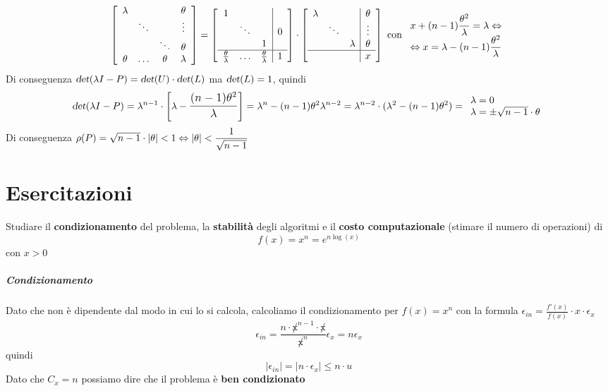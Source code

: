 \documentclass[10pt]{book}
\begin{document}
$$\left[ \begin{array}{c c c c}
\lambda & & & \theta\\
& \ddots & & \vdots\\
& & \ddots & \theta\\
\theta & \ldots & \theta & \lambda
\end{array}\right] = \left[ \begin{array}{c c c | c}
1 & & & \\
& \ddots & & 0\\
& & 1 & \\
\hline
\frac{\theta}{\lambda} & \ldots & \frac{\theta}{\lambda} & 1
\end{array}\right]\cdot \left[ \begin{array}{c c c | c}
\lambda & & & \theta \\
& \ddots & & \vdots\\
& & \lambda & \theta \\
\hline
& & & x
\end{array}\right]\text{ con }\begin{array}{l}
x + (n-1)\mathlarger{\frac{\theta^2}{\lambda}} = \lambda \Leftrightarrow\\
\Leftrightarrow x = \lambda - (n-1)\mathlarger{\frac{\theta^2}{\lambda}}
\end{array}$$
Di conseguenza $\textsl{det}(\lambda I - P) = \textsl{det}(U) \cdot \textsl{det}(L)$ ma $\textsl{det}(L) = 1$, quindi
$$\textsl{det}(\lambda I - P) = \lambda^{n-1}\cdot\left[\lambda - \mathlarger{\frac{(n-1)\theta^2}{\lambda}}\right] = \lambda^n - (n-1)\theta^2\lambda^{n-2} = \lambda^{n-2}\cdot(\lambda^2 - (n-1)\theta^2) = \begin{array}{l}
\lambda = 0\\
\lambda = \pm\sqrt{n-1}\cdot\theta
\end{array}$$
Di conseguenza $\rho(P) = \sqrt{n-1}\cdot|\theta| < 1 \Leftrightarrow |\theta| < \mathlarger{\frac{1}{\sqrt{n-1}}}$
\chapter{Esercitazioni}
Studiare il \textbf{condizionamento} del problema, la \textbf{stabilità} degli algoritmi e il \textbf{costo computazionale} (stimare il numero di operazioni) di $$f(x) = x^n = e^{n\log(x)}$$ con $x > 0$
\paragraph{Condizionamento} Dato che non è dipendente dal modo in cui lo si calcola, calcoliamo il condizionamento per $f(x) = x^n$ con la formula $\epsilon_{in} = \frac{f'(x)}{f(x)}\cdot x\cdot\epsilon_x$ $$\epsilon_{in} = \frac{n\cdot \not x^{n-1} \cdot \not x}{\not x^n}\epsilon_x = n\epsilon_x$$ quindi $$|\epsilon_{in}| = |n\cdot \epsilon_x| \leq n\cdot u$$
Dato che $C_x = n$ possiamo dire che il problema è \textbf{ben condizionato}
\end{document}
